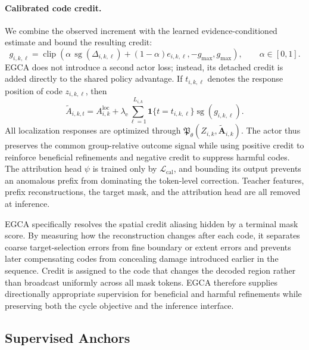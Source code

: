 \documentclass{article}
\begin{document}
\paragraph{Calibrated code credit.}
We combine the observed increment with the learned evidence-conditioned estimate and bound the resulting credit:
\begin{equation}\label{eq:egca-credit}
 g_{i,k,\ell}=
 \operatorname{clip}\!\left(
 \alpha\,\operatorname{sg}(\Delta_{i,k,\ell})
 +(1-\alpha)e_{i,k,\ell},
 -g_{\max},g_{\max}
 \right),\qquad \alpha\in[0,1].
\end{equation}
EGCA does not introduce a second actor loss; instead, its detached credit is added directly to the shared policy advantage. If $t_{i,k,\ell}$ denotes the response position of code $z_{i,k,\ell}$, then
\begin{equation}\label{eq:egca-policy}
 \widetilde A_{i,k,t}=
 A_{i,k}^{\mathrm{loc}}+
 \lambda_{\mathrm e}\sum_{\ell=1}^{L_{i,k}}
 \mathbf 1\{t=t_{i,k,\ell}\}\operatorname{sg}(g_{i,k,\ell}).
\end{equation}
All localization responses are optimized through $\mathfrak P_\theta(Z_{i,k},\widetilde{\mathbf A}_{i,k})$. The actor thus preserves the common group-relative outcome signal while using positive credit to reinforce beneficial refinements and negative credit to suppress harmful codes. The attribution head $\psi$ is trained only by $\mathcal L_{\mathrm{cal}}$, and bounding its output prevents an anomalous prefix from dominating the token-level correction. Teacher features, prefix reconstructions, the target mask, and the attribution head are all removed at inference.

EGCA specifically resolves the spatial credit aliasing hidden by a terminal mask score. By measuring how the reconstruction changes after each code, it separates coarse target-selection errors from fine boundary or extent errors and prevents later compensating codes from concealing damage introduced earlier in the sequence. Credit is assigned to the code that changes the decoded region rather than broadcast uniformly across all mask tokens. EGCA therefore supplies directionally appropriate supervision for beneficial and harmful refinements while preserving both the cycle objective and the inference interface.

\subsection{Supervised Anchors}\label{sec:supervised}
\end{document}
